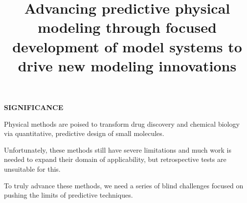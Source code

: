 \documentclass[11pt]{article}
\title{ Advancing predictive physical modeling through focused development of model systems to drive new modeling innovations}
\begin{document}





{\large \bf SIGNIFICANCE}

Physical methods are poised to transform drug discovery and chemical biology via quantitative, predictive design of small molecules. %

Unfortunately, these methods still have severe limitations and much work is needed to expand their domain of applicability, but retrospective tests are unsuitable for this. %

To truly advance these methods, we need a series of blind challenges focused on pushing the limits of predictive techniques. %
\end{document}
